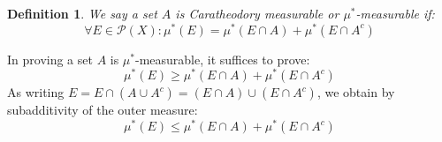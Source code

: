 \documentclass[10pt,letterpaper]{article} %
\newtheorem{defn}{Definition}[section]
\begin{document}
\begin{defn}
We say a set $A$ is Caratheodory measurable or $\mu^*$-measurable if:
\begin{equation*}
\forall E \in \mathcal{P}(X): \mu^*(E) = \mu^*(E \cap A) + \mu^*(E \cap A^c)
\end{equation*}
\end{defn}
In proving a set $A$ is $\mu^*$-measurable, it suffices to prove:
\begin{equation*}
\mu^*(E) \geqslant \mu^*(E \cap A) + \mu^*(E \cap A^c)
\end{equation*}
As writing $E = E \cap (A \cup A^c) = (E \cap A) \cup (E \cap A^c)$, we obtain by subadditivity of the outer measure:
\begin{equation*}
\mu^*(E) \leqslant \mu^*(E \cap A) + \mu^*(E \cap A^c)
\end{equation*}
\end{document}
